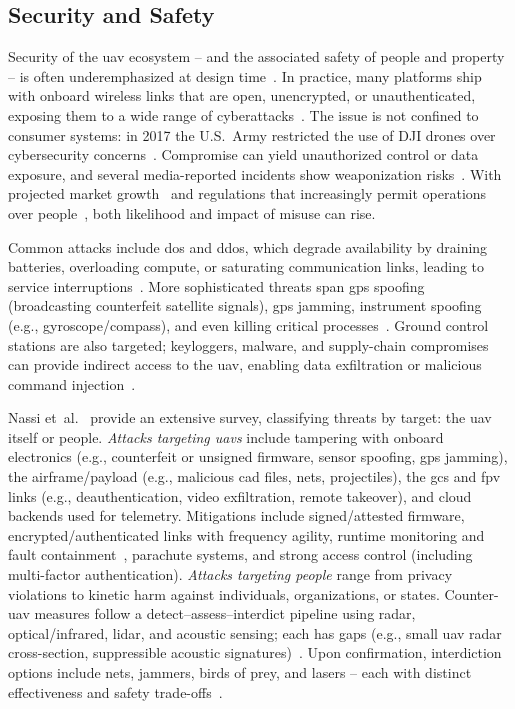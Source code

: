 \subsection{Security and Safety}%
\label{sec:security-safety}
Security of the \gls{uav} ecosystem -- and the associated safety of people and
property -- is often underemphasized at design time~\cite{leccadito2018survey}. 
In practice, many platforms ship with onboard wireless links that are open, unencrypted, or unauthenticated, exposing them to a wide range of cyberattacks~\cite{kishnaCyberVulnerUAVReview2017,mansfieldUAVCyberThreats2013}. 
The issue is not confined to consumer systems: in 2017 the U.S.\ Army restricted the use of DJI drones over cybersecurity concerns~\cite{suasNewsDjiDronesBanned2017}. 
Compromise can yield unauthorized control or data exposure, and several media-reported incidents show weaponization risks~\cite{spiegelUAVAccident2015,nytimesUAVAccident2018,theDriveUAVAccident2019}. 
With projected market growth~\cite{mohsan2022towards} and regulations that increasingly permit operations over people~\cite{stocker2017UAVRegulationsReview}, both likelihood and impact of misuse can rise.

Common attacks include \gls{dos} and \gls{ddos}, which degrade availability by
draining batteries, overloading compute, or saturating communication links,
leading to service interruptions~\cite{mohsan2022towards}.
More sophisticated threats span \gls{gps} spoofing (broadcasting counterfeit
satellite signals), \gls{gps} jamming, instrument spoofing (e.g.,
gyroscope/compass), and even killing critical processes~\cite{nassi2021sok}.
Ground control stations are also targeted; keyloggers, malware, and supply-chain
compromises can provide indirect access to the \gls{uav}, enabling data
exfiltration or malicious command injection~\cite{mohsan2022towards}.

Nassi et~al.~\cite{nassi2021sok} provide an extensive survey, classifying
threats by target: the \gls{uav} itself or people.
\emph{Attacks targeting \glspl{uav}} include tampering with onboard electronics
(e.g., counterfeit or unsigned firmware, sensor spoofing, \gls{gps} jamming),
the airframe/payload (e.g., malicious \gls{cad} files, nets, projectiles), the
\gls{gcs} and \gls{fpv} links (e.g., deauthentication, video exfiltration,
remote takeover), and cloud backends used for telemetry.
Mitigations include signed/attested firmware, encrypted/authenticated links with
frequency agility, runtime monitoring and fault
containment~\cite{mohsan2022towards}, parachute systems, and strong access
control (including multi-factor authentication).
\emph{Attacks targeting people} range from privacy violations to kinetic harm against individuals, organizations, or states. 
Counter-\gls{uav} measures follow a detect–assess–interdict pipeline using radar, optical/infrared, \gls{lidar}, and acoustic sensing; each has gaps (e.g., small \gls{uav} radar cross-section, suppressible acoustic signatures)~\cite{sathyamoorthy2015review}. 
Upon confirmation, interdiction options include nets, jammers, birds of prey,
and lasers -- each with distinct effectiveness and safety
trade-offs~\cite{nassi2021sok}.


